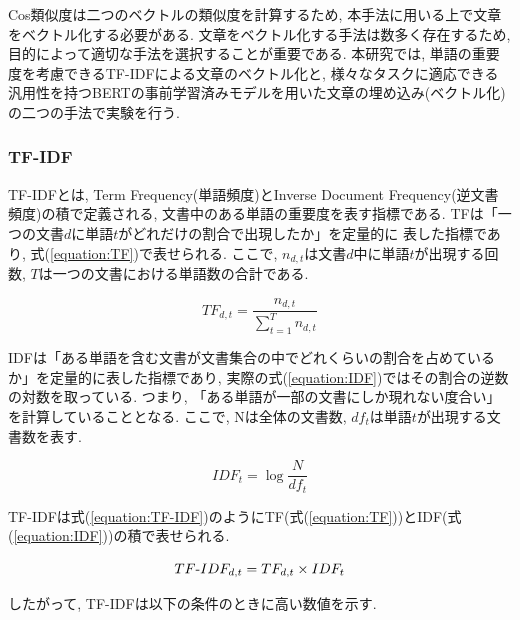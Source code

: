 \documentclass{ltjarticle}
\begin{document}
Cos類似度は二つのベクトルの類似度を計算するため, 本手法に用いる上で文章をベクトル化する必要がある. 
文章をベクトル化する手法は数多く存在するため, 目的によって適切な手法を選択することが重要である. 
本研究では, 単語の重要度を考慮できるTF-IDFによる文章のベクトル化と, 
様々なタスクに適応できる汎用性を持つBERTの事前学習済みモデルを用いた文章の埋め込み(ベクトル化)
の二つの手法で実験を行う. 
\subsubsection{TF-IDF}
TF-IDFとは, Term Frequency(単語頻度)とInverse Document Frequency(逆文書頻度)の積で定義される, 
文書中のある単語の重要度を表す指標である. TFは「一つの文書$d$に単語$t$がどれだけの割合で出現したか」を定量的に
表した指標であり, 式(\ref{equation:TF})で表せられる. ここで, $n_{d,t}$は文書$d$中に単語$t$が出現する回数, $T$は一つの文書における単語数の合計である. 
\vspace{5truept}

\begin{equation}
    TF_{d,t} = \dfrac{n_{d,t}}{\sum_{t=1}^T n_{d,t}}
    \label{equation:TF}
\end{equation}
\vspace{5truept}

IDFは「ある単語を含む文書が文書集合の中でどれくらいの割合を占めているか」を定量的に表した指標であり, 
実際の式(\ref{equation:IDF})ではその割合の逆数の対数を取っている. つまり, 「ある単語が一部の文書にしか現れない度合い」を計算していることとなる. 
ここで, Nは全体の文書数, $df_t$は単語$t$が出現する文書数を表す. 
\vspace{5truept}

\begin{equation}
    IDF_t = \log\dfrac{N}{df_t}
    \label{equation:IDF}
\end{equation}
\vspace{5truept}

\newpage
\noindent
TF-IDFは式(\ref{equation:TF-IDF})のようにTF(式(\ref{equation:TF}))とIDF(式(\ref{equation:IDF}))の積で表せられる. 
\vspace{5truept}

\begin{equation}
    TF\mathchar`-IDF_{d,t} = TF_{d,t}\times IDF_t
    \label{equation:TF-IDF}
\end{equation}
\vspace{5truept}

\noindent
したがって, TF-IDFは以下の条件のときに高い数値を示す. 
\vspace{5truept}
\end{document}
